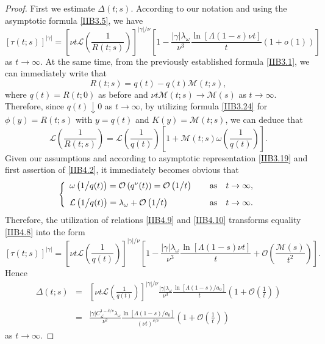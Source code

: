 \documentclass[10pt,reqno]{amsart}
\theoremstyle{definition}
\numberwithin{equation}{section}
\begin{document}
\begin{proof}
    First we estimate $\Delta (t;s)$. According to our notation and
    using the asymptotic formula {\eqref{IIB3.5}}, we have
\begin{equation}                \label{IIB4.8}
    {{\left[\tau(t;s)\right]}^{|\gamma|}}={{\left[\nu{t}\mathcal{L}\left(\frac{1}{R(t;s)}\right)\right]}^{{|\gamma|}/{\nu}}}
    \left[1-\frac{|\gamma|{{\lambda}_{\omega}}}{{\nu}^{3}}\frac{\ln[\Lambda(1-s)\nu{t}]}{t}\left(1+o(1)\right)\right]
\end{equation}
    as $t\to\infty$. At the same time, from the previously established
    formula {\eqref{IIB3.1}}, we can immediately write that
\[
    R(t;s)=q(t)-q(t)\mathcal{M}(t;s),
\]
    where $q(t)=R(t;0)$ as before and $\nu{t}\mathcal{M}(t;s)\to\mathcal{M}(s)$ as $t\to\infty$. Therefore,
    since $q(t)\downarrow{0}$ as $t\to\infty$, by utilizing formula {\eqref{IIB3.24}} for $\phi(y)=R(t;s)$
    with $y=q(t)$ and $K(y)=\mathcal{M}(t;s)$, we can deduce that
\begin{equation}                \label{IIB4.9}
    \mathcal{L}\left(\frac{1}{R(t;s)}\right)=\mathcal{L}\left(\frac{1}{q(t)}\right)
    \left[1+\mathcal{M}(t;s)\omega\left(\frac{1}{q(t)}\right)\right].
\end{equation}
    Given our assumptions and according to asymptotic representation {\eqref{IIB3.19}} and
    first assertion of {\eqref{IIB4.2}}, it immediately becomes obvious that
\begin{align}                \label{IIB4.10}
\left\{
\begin{array}{l}
    \omega\left({1}\big/{q(t)}\right)=\mathcal{O}\left({q^{\nu}}(t)\right)=\mathcal{O}\left({1}\big/{t}\right)
    \qquad \hfill {\text{as}} \quad {t\to\infty,}
\vspace{2.8mm}  \\
    \mathcal{L}\left({1}\big/{q(t)}\right)={{\lambda}_{\omega}}+\mathcal{O}\left({1}\big/{t}\right)
    \qquad \hfill {\text{as}} \quad {t\to\infty.}\\
\end{array}
\right.
\end{align}
    Therefore, the utilization of relations {\eqref{IIB4.9}} and {\eqref{IIB4.10}} transforms equality {\eqref{IIB4.8}} into the form
\[
    {{\left[\tau(t;s)\right]}^{|\gamma|}}={{\left[\nu{t}\mathcal{L}\left(\frac{1}{q(t)}\right)\right]}^{{|\gamma|}/{\nu}}}
    \left[1-\frac{|\gamma|{{\lambda}_{\omega}}}{{\nu}^{3}}\frac{\ln[\Lambda(1-s)\nu{t}]}{t}+
    \mathcal{O}\left(\frac{\mathcal{M}(s)}{{t^{2}}}\right)\right].
\]
    Hence
\begin{eqnarray}              \label{IIB4.11}
    {\Delta(t;s)}
& = & {{\left[\nu{t}\mathcal{L}\left(\frac{1}{q(t)}\right)\right]}^{{|\gamma|}/{\nu}}}
    \frac{|\gamma|{{\lambda}_{\omega}}}{{\nu}^{3}}\frac{\ln\left[{\Lambda(1-s)}/{a_0}\right]}{t}
    \left(1+\mathcal{O}\left(\frac{1}{t}\right)\right) \nonumber\\
\ \nonumber\\
& = & \frac{|\gamma|C_{\mathcal{L}}^{1-{\delta}/{\nu}}{{\lambda}_{\omega}}}{{\nu}^2}
    \frac{\ln\left[{\Lambda(1-s)}/{a_0}\right]}{{(\nu{t})}^{{\delta}/{\nu}}}\left(1+\mathcal{O}\left(\frac{1}{t}\right)\right)
\end{eqnarray}
    as $t\to\infty$.


\end{proof}
\end{document}
